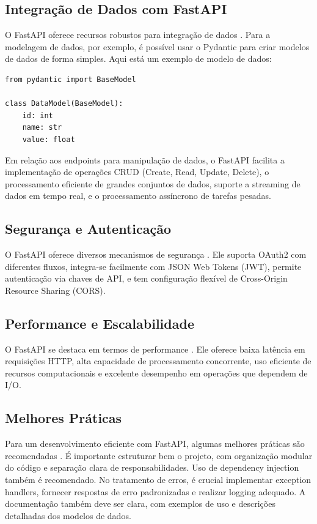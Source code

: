 \subsection{Integração de Dados com FastAPI}
O FastAPI oferece recursos robustos para integração de dados \cite{wilson2023data}. Para a modelagem de dados, por exemplo, é possível usar o Pydantic para criar modelos de dados de forma simples. Aqui está um exemplo de modelo de dados:
\begin{verbatim}
from pydantic import BaseModel

class DataModel(BaseModel):
    id: int
    name: str
    value: float
\end{verbatim}
Em relação aos endpoints para manipulação de dados, o FastAPI facilita a implementação de operações CRUD (Create, Read, Update, Delete), o processamento eficiente de grandes conjuntos de dados, suporte a streaming de dados em tempo real, e o processamento assíncrono de tarefas pesadas.
\subsection{Segurança e Autenticação}
O FastAPI oferece diversos mecanismos de segurança \cite{brown2023securing}. Ele suporta OAuth2 com diferentes fluxos, integra-se facilmente com JSON Web Tokens (JWT), permite autenticação via chaves de API, e tem configuração flexível de Cross-Origin Resource Sharing (CORS).
\subsection{Performance e Escalabilidade}
O FastAPI se destaca em termos de performance \cite{performance_metrics}. Ele oferece baixa latência em requisições HTTP, alta capacidade de processamento concorrente, uso eficiente de recursos computacionais e excelente desempenho em operações que dependem de I/O.
\subsection{Melhores Práticas}
Para um desenvolvimento eficiente com FastAPI, algumas melhores práticas são recomendadas \cite{martinez2023best}. É importante estruturar bem o projeto, com organização modular do código e separação clara de responsabilidades. Uso de dependency injection também é recomendado. No tratamento de erros, é crucial implementar exception handlers, fornecer respostas de erro padronizadas e realizar logging adequado. A documentação também deve ser clara, com exemplos de uso e descrições detalhadas dos modelos de dados.
